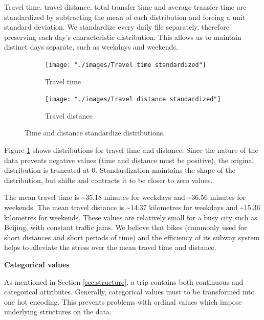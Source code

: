 \documentclass{article}
\begin{document}
Travel time, travel distance, total transfer time and average transfer time are standardized by subtracting the mean of each distribution and forcing a unit standard deviation. We standardize every daily file separately, therefore preserving each day's characteristic distribution. This allows us to maintain distinct days separate, such as weekdays and weekends.

\begin{figure}[H]
  \centering
  \begin{subfigure}[b]{.45\textwidth}
  	\centering
  	\texttt{[image: "./images/Travel time standardized"]}
  	\caption{Travel time}
  \end{subfigure}
  \begin{subfigure}[b]{.45\textwidth}
  	\centering
  	\texttt{[image: "./images/Travel distance standardized"]}
  	\caption{Travel distance}
  \end{subfigure}
  \caption{Time and distance standardize distributions.}
  	\label{fig:preprocessing/timeDist}
\end{figure}

Figure \ref{fig:preprocessing/timeDist} shows distributions for travel time and distance. Since the nature of the data prevents negative values (time and distance must be positive), the original distribution is truncated at 0. Standardization maintains the shape of the distribution, but shifts and contracts it to be closer to zero values.

The mean travel time is \textasciitilde 35.18 minutes for weekdays and \textasciitilde 36.56 minutes for weekends. The mean travel distance is \textasciitilde 14.37 kilometres for weekdays and \textasciitilde 15.36 kilometres for weekends. These values are relatively small for a busy city such as Beijing, with constant traffic jams. We believe that bikes (commonly used for short distances and short periods of time) and the efficiency of its subway system helps to alleviate the stress over the mean travel time and distance. 


\textbf{Categorical values}

As mentioned in Section \ref{sec:structure}, a trip contains both continuous and categorical attributes. Generally, categorical values must to be transformed into one hot encoding. This prevents problems with ordinal values which impose underlying structures on the data.
\end{document}
